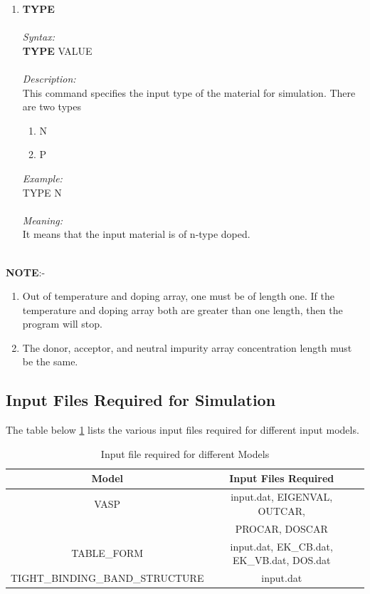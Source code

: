 \documentclass[12pt]{article}
\begin{document}
\begin{enumerate}
 
    \item \textbf{TYPE} \\ \\
    \textit{Syntax:} \\
    \textbf{TYPE} VALUE \\ \\
    \textit{Description:} \\
    This command specifies the input type of the material for simulation. There are two types 
    \begin{enumerate}
        \item N
        \item P
    \end{enumerate}
    \textit{Example:} \\
    TYPE N \\ \\
    \textit{Meaning:} \\    
    It means that the input material is of n-type doped. \\ \\

\end{enumerate}

    \textbf{NOTE}:-
    \begin{enumerate}

    \item Out of temperature and doping array, one must be of length one. If the temperature and doping array both are greater than one length, then the program will stop. 
    \item The donor, acceptor, and neutral impurity array concentration length must be the same. 
    \end{enumerate}
    
    \subsection{Input Files Required for Simulation}  
    The table below \ref{input_files_table} lists the various input files required for different input models.
    
\begin{table} [H]
\caption{ Input file required for different Models}
\label{input_files_table}
\begin{tabular}{|c|c|c|}
\hline
Model & Input Files Required   \\
\hline                                      
VASP   & input.dat, EIGENVAL, OUTCAR, \\
& PROCAR, DOSCAR \\
\hline   
TABLE\_FORM & input.dat, EK\_CB.dat, EK\_VB.dat, DOS.dat    \\
\hline  
TIGHT\_BINDING\_BAND\_STRUCTURE   & input.dat     \\
\hline
\end{tabular}
\end{table}
\end{document}
